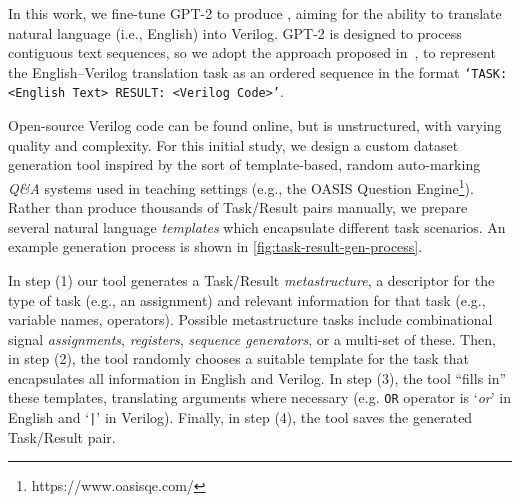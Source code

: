 
In this work, we fine-tune GPT-2 to produce \sol, aiming for the ability to translate natural language (i.e., English) into Verilog. 
GPT-2 is designed to process contiguous text sequences, so we adopt the approach proposed in~\cite{radford_improving_nodate}, to represent the English--Verilog translation task as an ordered sequence 
in the format \texttt{`TASK: <English Text> RESULT: <Verilog Code>'}.

Open-source Verilog code can be found online, but is unstructured, with varying quality and complexity. 
For this initial study, we design a custom dataset generation tool inspired by the sort of template-based, random auto-marking \emph{Q\&A} systems used in teaching settings (e.g., the OASIS Question Engine\footnote{https://www.oasisqe.com/}).
Rather than produce thousands of Task/Result pairs manually, we prepare several natural language \emph{templates} which encapsulate different task scenarios. %
An example generation process is shown in \autoref{fig:task-result-gen-process}.

In step (1) our tool generates a Task/Result \emph{metastructure}, a descriptor for the type of task (e.g., an assignment) and relevant information for that task (e.g., variable names, operators).
Possible metastructure tasks include combinational signal \emph{assignments}, \emph{registers}, \emph{sequence generators}, or a multi-set of these. 
Then, in step (2), the tool randomly chooses a suitable template for the task that encapsulates all information in English and Verilog.
In step (3), the tool ``fills in'' these templates, translating arguments where necessary (e.g. \texttt{OR} operator is `\emph{or}' in English and `\texttt{|}' in Verilog). Finally, in step (4), the tool saves the generated Task/Result pair. %


